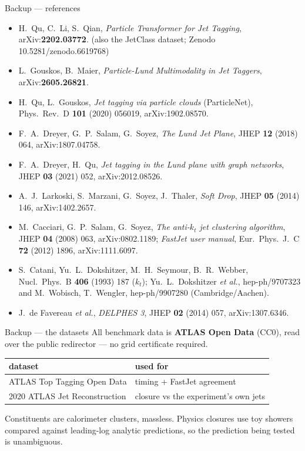 \documentclass[aspectratio=169,10pt]{beamer}
\newcommand{\smallnote}[1]{{\footnotesize\color{fjgray} #1}}
\begin{document}
\begin{frame}{Backup --- references}
\small
\begin{itemize}\setlength{\itemsep}{3pt}
  \item H.~Qu, C.~Li, S.~Qian, \emph{Particle Transformer for Jet Tagging},
        arXiv:\textbf{2202.03772}. \smallnote{(also the JetClass dataset;
        Zenodo 10.5281/zenodo.6619768)}
  \item L.~Gouskos, B.~Maier, \emph{Particle-Lund Multimodality in Jet Taggers},
        arXiv:\textbf{2605.26821}.
  \item H.~Qu, L.~Gouskos, \emph{Jet tagging via particle clouds}
        \smallnote{(ParticleNet)}, Phys.~Rev.~D \textbf{101} (2020) 056019,
        arXiv:1902.08570.
  \item F.~A.~Dreyer, G.~P.~Salam, G.~Soyez, \emph{The Lund Jet Plane},
        JHEP \textbf{12} (2018) 064, arXiv:1807.04758.
  \item F.~A.~Dreyer, H.~Qu, \emph{Jet tagging in the Lund plane with graph
        networks}, JHEP \textbf{03} (2021) 052, arXiv:2012.08526.
  \item A.~J.~Larkoski, S.~Marzani, G.~Soyez, J.~Thaler, \emph{Soft Drop},
        JHEP \textbf{05} (2014) 146, arXiv:1402.2657.
  \item M.~Cacciari, G.~P.~Salam, G.~Soyez, \emph{The anti-$k_t$ jet clustering
        algorithm}, JHEP \textbf{04} (2008) 063, arXiv:0802.1189; \emph{FastJet
        user manual}, Eur.~Phys.~J.~C \textbf{72} (2012) 1896, arXiv:1111.6097.
  \item S.~Catani, Yu.~L.~Dokshitzer, M.~H.~Seymour, B.~R.~Webber,
        Nucl.~Phys.~B \textbf{406} (1993) 187 \smallnote{($k_t$)};
        Yu.~L.~Dokshitzer \emph{et al.}, hep-ph/9707323 and M.~Wobisch,
        T.~Wengler, hep-ph/9907280 \smallnote{(Cambridge/Aachen)}.
  \item J.~de Favereau \emph{et al.}, \emph{DELPHES 3}, JHEP \textbf{02} (2014)
        057, arXiv:1307.6346.
\end{itemize}
\end{frame}

\begin{frame}{Backup --- the datasets}
All benchmark data is \textbf{ATLAS Open Data} (CC0), read over the public
redirector --- no grid certificate required.
\medskip

\begin{center}
\begin{tabular}{@{}ll@{}}
\toprule
dataset & used for\\
\midrule
ATLAS Top Tagging Open Data & timing + FastJet agreement\\
2020 ATLAS Jet Reconstruction & closure vs the experiment's own jets\\
\bottomrule
\end{tabular}
\end{center}
\medskip

\smallnote{Constituents are calorimeter clusters, massless. Physics closures use
toy showers compared against leading-log analytic predictions, so the prediction
being tested is unambiguous.}
\end{frame}
\end{document}
